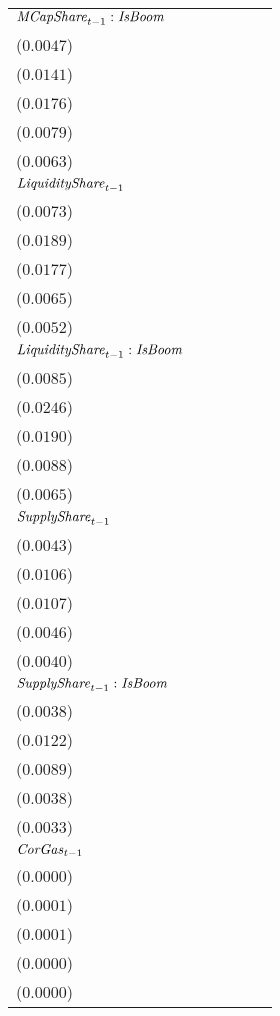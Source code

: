 \begin{tabular}{llllll}
${\it MCapShare}_{t-1}:{\it IsBoom}$      &     \makecell{$-0.0003^{}$ \\ ($0.0047$)} &     \makecell{$-0.0228^{}$ \\ ($0.0141$)} &   \makecell{$0.0828^{***}$ \\ ($0.0176$)} &   \makecell{$0.0279^{***}$ \\ ($0.0079$)} &    \makecell{$0.0142^{**}$ \\ ($0.0063$)} \\
${\it LiquidityShare}_{t-1}$              &   \makecell{$0.0480^{***}$ \\ ($0.0073$)} &   \makecell{$0.0771^{***}$ \\ ($0.0189$)} &   \makecell{$0.1099^{***}$ \\ ($0.0177$)} &   \makecell{$0.0184^{***}$ \\ ($0.0065$)} &   \makecell{$0.0151^{***}$ \\ ($0.0052$)} \\
${\it LiquidityShare}_{t-1}:{\it IsBoom}$ &     \makecell{$-0.0012^{}$ \\ ($0.0085$)} &      \makecell{$0.0267^{}$ \\ ($0.0246$)} &     \makecell{$-0.0020^{}$ \\ ($0.0190$)} &      \makecell{$0.0089^{}$ \\ ($0.0088$)} &      \makecell{$0.0068^{}$ \\ ($0.0065$)} \\
${\it SupplyShare}_{t-1}$                 &   \makecell{$0.0195^{***}$ \\ ($0.0043$)} &   \makecell{$0.0399^{***}$ \\ ($0.0106$)} &   \makecell{$0.0428^{***}$ \\ ($0.0107$)} &      \makecell{$0.0073^{}$ \\ ($0.0046$)} &      \makecell{$0.0036^{}$ \\ ($0.0040$)} \\
${\it SupplyShare}_{t-1}:{\it IsBoom}$    &    \makecell{$-0.0069^{*}$ \\ ($0.0038$)} &     \makecell{$-0.0017^{}$ \\ ($0.0122$)} &   \makecell{$-0.0198^{**}$ \\ ($0.0089$)} &     \makecell{$-0.0006^{}$ \\ ($0.0038$)} &     \makecell{$-0.0001^{}$ \\ ($0.0033$)} \\
${\it CorGas}_{t-1}$                      &      \makecell{$0.0000^{}$ \\ ($0.0000$)} &     \makecell{$-0.0000^{}$ \\ ($0.0001$)} &      \makecell{$0.0001^{}$ \\ ($0.0001$)} &      \makecell{$0.0000^{}$ \\ ($0.0000$)} &     \makecell{$-0.0000^{}$ \\ ($0.0000$)} \\

\end{tabular}
